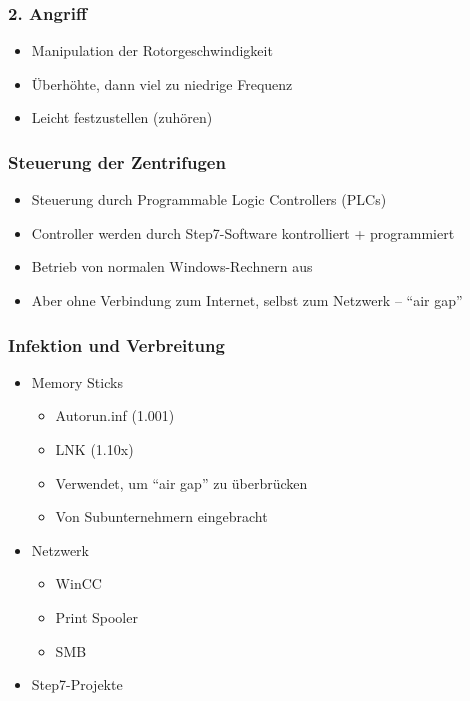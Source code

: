 \documentclass{beamer}
\begin{document}
\begin{frame}
  \frametitle{2. Angriff}
  \begin{itemize}
    \item Manipulation der Rotorgeschwindigkeit
    \item Überhöhte, dann viel zu niedrige Frequenz
    \item Leicht festzustellen (zuhören)
  \end{itemize}
\end{frame}

\begin{frame}
  \frametitle{Steuerung der Zentrifugen}
  \begin{itemize}
    \item Steuerung durch Programmable Logic Controllers (PLCs)
    \item Controller werden durch Step7-Software kontrolliert + programmiert
    \item Betrieb von normalen Windows-Rechnern aus
    \item Aber ohne Verbindung zum Internet, selbst zum Netzwerk – “air gap”
  \end{itemize}
\end{frame}

\begin{frame}
  \frametitle{Infektion und Verbreitung}
  \begin{itemize}
    \item Memory Sticks
      \begin{itemize}
        \item Autorun.inf (1.001)
        \item LNK (1.10x)
        \item Verwendet, um “air gap” zu überbrücken
        \item Von Subunternehmern eingebracht
      \end{itemize}
    \item Netzwerk
      \begin{itemize}
        \item WinCC
        \item Print Spooler
        \item SMB
      \end{itemize}
    \item Step7-Projekte
  \end{itemize}
\end{frame}
\end{document}
